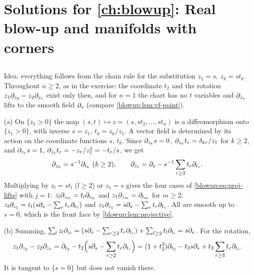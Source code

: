 \providecommand{\Vb}{\mathcal{V}_{\mathrm{b}}}
\providecommand{\bT}{{}^{\mathrm{b}}T}
\providecommand{\relRC}[2]{{}^{#1}\overline{#2}}

\section[Solutions: real blow-up]{Solutions for \cref{ch:blowup}: Real blow-up and manifolds with corners}\label{solutions:blowup}

\subsection*{}
Idea: everything follows from the chain rule for the substitution $z_1=s$, $z_k=st_k$.
Throughout $n\ge2$, as in the exercise: the coordinate $t_2$ and the rotation
$z_1\partial_{z_2}-z_2\partial_{z_1}$ exist only then, and for $n=1$ the chart has no $t$ variables and
$\partial_{z_1}$ lifts to the smooth field $\partial_s$ (compare \cref{blowup:lem:vf-point}).

(a) On $\{z_1>0\}$ the map $(s,t)\mapsto z=(s,st_2,\dots,st_n)$ is a diffeomorphism onto
$\{z_1>0\}$, with inverse $s=z_1$, $t_k=z_k/z_1$. A vector field is determined by its
action on the coordinate functions $s$, $t_k$. Since $\partial_{z_k}s=0$, $\partial_{z_k}t_r=\delta_{kr}/z_1$
for $k\ge2$, and $\partial_{z_1}s=1$, $\partial_{z_1}t_r=-z_r/z_1^2=-t_r/s$, we get
\begin{equation*}
  \pa_{z_k}=s^{-1}\pa_{t_k}\ (k\ge2),\qquad\pa_{z_1}=\pa_s-s^{-1}\sum_{r\ge2}t_r\pa_{t_r}.
\end{equation*}
Multiplying by $z_l=st_l$ ($l\ge2$) or $z_1=s$ gives the four cases of
\eqref{blowup:eq:proj-lifts} with $j=1$: $z_l\partial_{z_m}=t_l\partial_{t_m}$ and $z_1\partial_{z_m}=\partial_{t_m}$
for $m\ge2$; $z_l\partial_{z_1}=t_l(s\partial_s-\sum_rt_r\partial_{t_r})$ and
$z_1\partial_{z_1}=s\partial_s-\sum_rt_r\partial_{t_r}$. All are smooth up to $s=0$, which is the front face
by \cref{blowup:lem:projective}.

(b) Summing, $\sum_lz_l\partial_{z_l}=(s\partial_s-\sum_{r\ge2}t_r\partial_{t_r})+\sum_{l\ge2}t_l\partial_{t_l}=s\partial_s$.
For the rotation,
\begin{equation*}
  z_1\partial_{z_2}-z_2\partial_{z_1}=\partial_{t_2}-t_2\Big(s\partial_s-\sum_{r\ge2}t_r\partial_{t_r}\Big)
  =(1+t_2^2)\partial_{t_2}-t_2s\partial_s+t_2\sum_{r\ge3}t_r\partial_{t_r}.
\end{equation*}
It is tangent to $\{s=0\}$ but does not vanish there.

